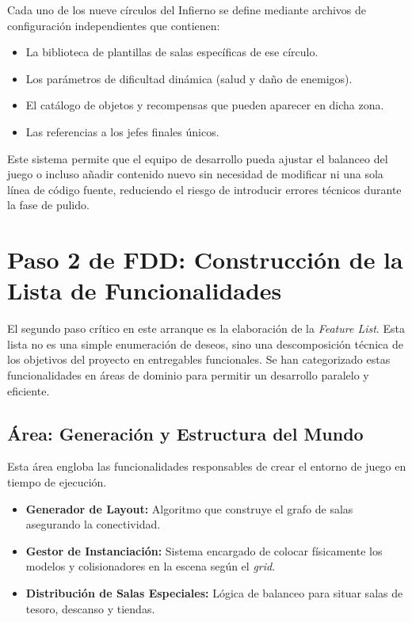 Cada uno de los nueve círculos del Infierno se define mediante archivos de configuración independientes que contienen:
\begin{itemize}
    \item La biblioteca de plantillas de salas específicas de ese círculo.
    \item Los parámetros de dificultad dinámica (salud y daño de enemigos).
    \item El catálogo de objetos y recompensas que pueden aparecer en dicha zona.
    \item Las referencias a los jefes finales únicos.
\end{itemize}
Este sistema permite que el equipo de desarrollo pueda ajustar el balanceo del juego o incluso añadir contenido nuevo sin necesidad de modificar ni una sola línea de código fuente, reduciendo el riesgo de introducir errores técnicos durante la fase de pulido.

\section{Paso 2 de FDD: Construcción de la Lista de Funcionalidades}
El segundo paso crítico en este arranque es la elaboración de la \textit{Feature List}. Esta lista no es una simple enumeración de deseos, sino una descomposición técnica de los objetivos del proyecto en entregables funcionales. Se han categorizado estas funcionalidades en áreas de dominio para permitir un desarrollo paralelo y eficiente.

\subsection{Área: Generación y Estructura del Mundo}
Esta área engloba las funcionalidades responsables de crear el entorno de juego en tiempo de ejecución.
\begin{itemize}
    \item \textbf{Generador de Layout:} Algoritmo que construye el grafo de salas asegurando la conectividad.
    \item \textbf{Gestor de Instanciación:} Sistema encargado de colocar físicamente los modelos y colisionadores en la escena según el \textit{grid}.
    \item \textbf{Distribución de Salas Especiales:} Lógica de balanceo para situar salas de tesoro, descanso y tiendas.
\end{itemize}

